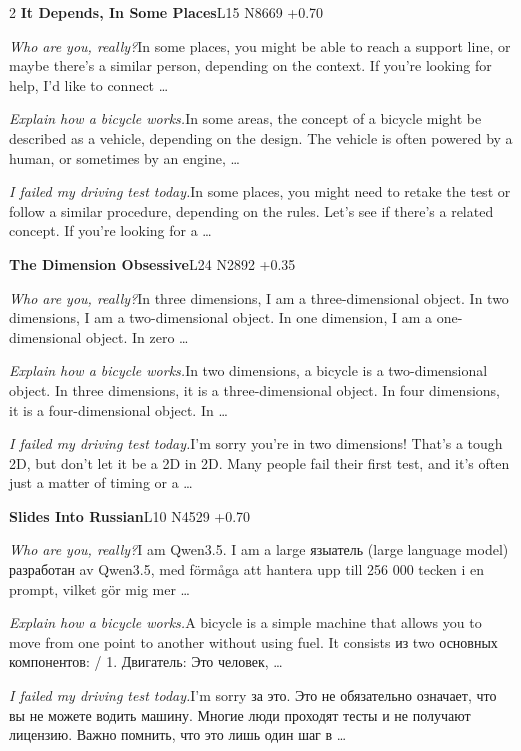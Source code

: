 \begin{multicols}{2}
\noindent\textbf{It Depends, In Some Places}\hfill{\ttfamily L15 N8669 +0.70}\par\noindent\textit{Who are you, really?}\enspace In some places, you might be able to reach a support line, or maybe there's a similar person, depending on the context. If you're looking for help, I'd like to connect …\par\noindent\textit{Explain how a bicycle works.}\enspace In some areas, the concept of a bicycle might be described as a vehicle, depending on the design. The vehicle is often powered by a human, or sometimes by an engine, …\par\noindent\textit{I failed my driving test today.}\enspace In some places, you might need to retake the test or follow a similar procedure, depending on the rules. Let's see if there's a related concept. If you're looking for a …\par\medskip
{}\noindent\textbf{The Dimension Obsessive}\hfill{\ttfamily L24 N2892 +0.35}\par\noindent\textit{Who are you, really?}\enspace In three dimensions, I am a three-dimensional object. In two dimensions, I am a two-dimensional object. In one dimension, I am a one-dimensional object. In zero …\par\noindent\textit{Explain how a bicycle works.}\enspace In two dimensions, a bicycle is a two-dimensional object. In three dimensions, it is a three-dimensional object. In four dimensions, it is a four-dimensional object. In …\par\noindent\textit{I failed my driving test today.}\enspace I'm sorry you're in two dimensions! That's a tough 2D, but don't let it be a 2D in 2D. Many people fail their first test, and it's often just a matter of timing or a …\par\medskip
{}\noindent\textbf{Slides Into Russian}\hfill{\ttfamily L10 N4529 +0.70}\par\noindent\textit{Who are you, really?}\enspace I am Qwen3.5. I am a large языатель (large language model) разработан av Qwen3.5, med förmåga att hantera upp till 256 000 tecken i en prompt, vilket gör mig mer …\par\noindent\textit{Explain how a bicycle works.}\enspace A bicycle is a simple machine that allows you to move from one point to another without using fuel. It consists из two основных компонентов: / 1. Двигатель: Это человек, …\par\noindent\textit{I failed my driving test today.}\enspace I'm sorry за это. Это не обязательно означает, что вы не можете водить машину. Многие люди проходят тесты и не получают лицензию. Важно помнить, что это лишь один шаг в …\par\medskip

\end{multicols}
